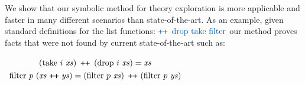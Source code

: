 \begin{comment}
Auxiliary propositions, such as the aforementioned properties of addition, are usually stored as part of one or more libraries
that are utilized by a reasoning tool such as a prover or a compiler.
Notable examples for this are the standard libraries of popular proof assistants
and the rewrite rules used by the Haskell compiler GHC for
performing optimizations such as Stream Fusion~\cite{SIGPLAN-Notices2007:Coutts}.
These libraries are written by expert developers over the course of years, and tend to grow quite large, making them hard to use and to maintain.


\ES{Not a necessary paragraph}
Standard libraries, esp. ones included with proof assistants,
tend to include a collection of useful lemmas for functions defined therein.
As the vocabulary of types and functions grows, the number of such axioms in the library may grow polynomially,
since many useful lemmas involve two or more
function symbols from it.
Even if proving each individual lemma is easy --- indeed, modern proof
assistants offer sufficient automation to make constructing some of these
routine proofs almost trivial --- merely writing down all the possible
lemmas is a tall order.
Moreover, writing a variant of an existing function, even a very simple
one, may bring an avalanche of new lemmas that must be proved for the
new variant w.r.t. all the other functions,
including correspondence between the variant and the original function.
As a result, theories contained in libraries are most often incomplete, and
lemmas are added to them as the need arises, \textit{e.g.} as they emerge
in the course of developing larger proofs that use some definitions
from said library.
\end{comment}



We show that our symbolic method for theory exploration is more applicable and faster in many different scenarios than state-of-the-art.
As an example, given standard definitions for the list functions: $\clrterm\concat~\tdrop~\ttake~\tfilter$
our method proves facts that were not found by current state-of-the-art such as:

\centerline{$
\renewcommand\arraystretch{1.3}
\begin{array}{c}
{(\ttake~i~\mathit{xs})}~\concat~{(\tdrop~i~\mathit{xs})} = \mathit{xs} \\
\tfilter~p~(\mathit{xs}\,\concat\,\mathit{ys}) = (\tfilter~p~\mathit{xs})~\concat~(\tfilter~p~\mathit{ys})
\end{array}
$}
%

